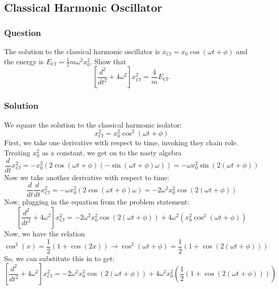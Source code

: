 \documentclass[12pt]{article}
\begin{document}
\subsection{Classical Harmonic Oscillator}
\subsubsection{Question}
The solution to the classical harmonic oscillator is $x_{Cl} = x_0 \cos(\omega t + \phi)$ and the energy is $E_{Cl} = \frac{1}{2} m\omega^2 x_0^2$. Show that 
\[
\left[ \frac{d^2}{dt^2} + 4\omega^2 \right] x_{Cl}^2 = \frac{4}{m} E_{Cl}.
\]
\subsubsection{Solution}
We square the solution to the classical harmonic isolator:
\begin{equation}
    x_{Cl}^{2} = x_{0}^{2}\cos^{2}(\omega t + \phi)
\end{equation}
First, we take one derivative with respect to time, invoking they chain role. Treating $x_{0}^{2}$ as a constant, we get on to the nasty algebra
\begin{equation}
    \frac{d}{dt}x_{Cl}^{2} = -x_{0}^{2}(2\cos(\omega t + \phi)(-\sin(\omega t + \phi)\omega)) = -\omega x_{0}^{2} \sin({2(\omega t + \phi)})
\end{equation}
Now we take another derivative with respect to time:
\begin{equation}
    \frac{d}{dt}\frac{d}{dt}x_{Cl}^{2} = -\omega x_{0}^{2}(2\cos(\omega t + \phi)\omega) = -2\omega^{2}x_{0}^{2}\cos(2(\omega t + \phi))
\end{equation}
Now, plugging in the equation from the problem statement:
\begin{equation}
    \left[ \frac{d^2}{dt^2} + 4\omega^2 \right] x_{Cl}^2 = -2\omega^{2}x_{0}^{2}\cos(2(\omega t + \phi)) + 4\omega^{2} \left(x_{0}^{2}\cos^{2}(\omega t + \phi)\right)
\end{equation}
Now, we have the relation
\begin{equation}
    \cos^{2}(x) = \frac{1}{2}(1 + \cos(2x))\rightarrow\cos^{2}(\omega t + \phi) = \frac{1}{2}(1 + \cos(2(\omega t + \phi)))
\end{equation}
So, we can substitute this in to get:
\begin{equation}
    \left[ \frac{d^2}{dt^2} + 4\omega^2 \right] x_{Cl}^2 = -2\omega^{2}x_{0}^{2}\cos(2(\omega t + \phi)) + 4\omega^{2} x_{0}^{2}\left(\frac{1}{2}(1 + \cos(2(\omega t + \phi)))\right)
\end{equation}
\end{document}
